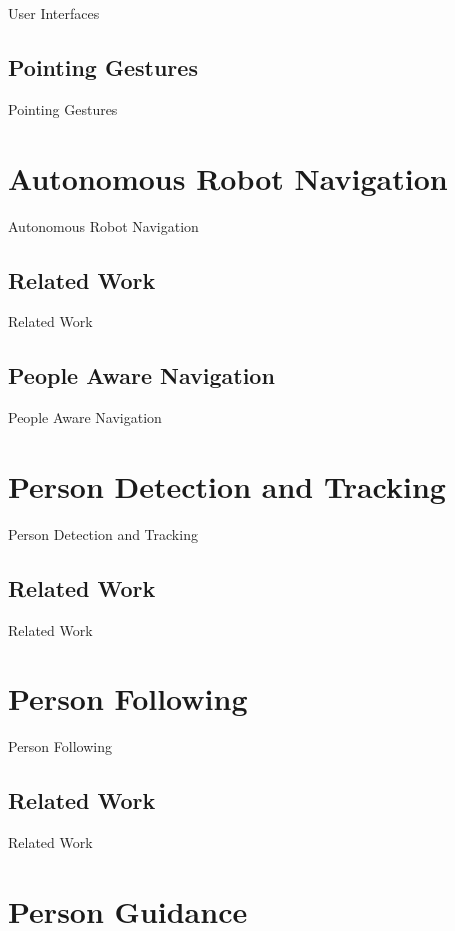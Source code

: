 \documentclass[12pt]{gatech-thesis}
\begin{document}
User Interfaces

\section{Pointing Gestures}

Pointing Gestures

\chapter{Autonomous Robot Navigation}

Autonomous Robot Navigation

\section{Related Work}

Related Work

\section{People Aware Navigation}

People Aware Navigation

\chapter{Person Detection and Tracking}

Person Detection and Tracking

\section{Related Work}

Related Work

\chapter{Person Following}

Person Following

\section{Related Work}

Related Work

\chapter{Person Guidance}
\end{document}
